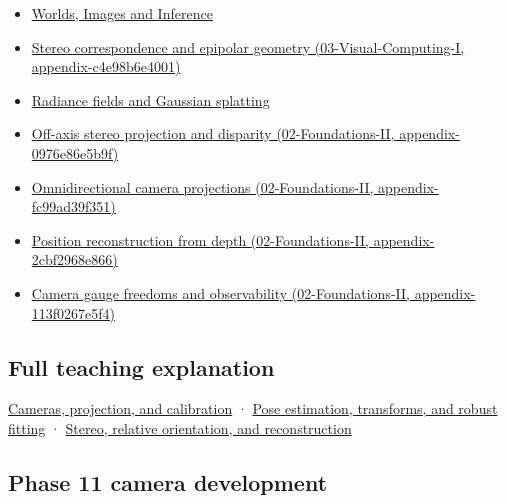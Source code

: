 \begin{itemize}
\item
  \href{Continuous\%20Notes/University\%20-\%20Worlds,\%20Images\%20and\%20Inference\%20-\%20Graphics,\%20Vision\%20and\%20Photography}{Worlds, Images and Inference}
\item
  \href{}{Stereo correspondence and epipolar geometry (03-Visual-Computing-I, appendix-c4e98b6e4001)}
\item
  \hyperref[appendix-c5b332e400e7]{Radiance fields and Gaussian splatting}
\item
  \href{}{Off-axis stereo projection and disparity (02-Foundations-II, appendix-0976e86e5b9f)}
\item
  \href{}{Omnidirectional camera projections (02-Foundations-II, appendix-fc99ad39f351)}
\item
  \href{}{Position reconstruction from depth (02-Foundations-II, appendix-2cbf2968e866)}
\item
  \href{}{Camera gauge freedoms and observability (02-Foundations-II, appendix-113f0267e5f4)}
\end{itemize}

\subsection{Full teaching explanation}\label{full-teaching-explanation}

\href{Continuous\%20Notes/University\%20-\%20Worlds,\%20Images\%20and\%20Inference\%20-\%20Graphics,\%20Vision\%20and\%20Photography\#Cameras,\%20projection,\%20and\%20calibration}{Cameras, projection, and calibration} · \href{Continuous\%20Notes/University\%20-\%20Worlds,\%20Images\%20and\%20Inference\%20-\%20Graphics,\%20Vision\%20and\%20Photography\#Pose\%20estimation,\%20transforms,\%20and\%20robust\%20fitting}{Pose estimation, transforms, and robust fitting} · \href{Continuous\%20Notes/University\%20-\%20Worlds,\%20Images\%20and\%20Inference\%20-\%20Graphics,\%20Vision\%20and\%20Photography\#Stereo,\%20relative\%20orientation,\%20and\%20reconstruction}{Stereo, relative orientation, and reconstruction}

\subsection{Phase 11 camera development}\label{phase-11-camera-development}

